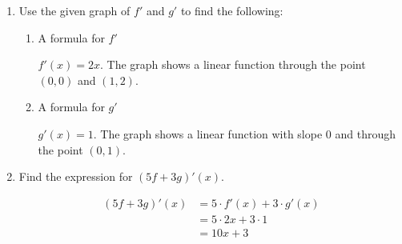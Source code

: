 \documentclass{ximera}
\begin{document}
\begin{problem}
\begin{enumerate}
	\item Use the given graph of $f'$ and $g'$ to find the following:
	\begin{enumerate}
		\item A formula for $f'$
\begin{explanation}
				$f'(x)=2x$.  The graph shows a linear function through the point $(0,0)$ and $(1,2)$.
			\end{explanation}
	
		\item A formula for $g'$
\begin{explanation}
				$g'(x)=1$.  The graph shows a linear function with slope $0$ and through the point $(0,1)$.
			\end{explanation}
	\end{enumerate}

	\item Find the expression for $(5f+3g)'(x)$.
\begin{explanation}
         \begin{align*}
           (5f+3g)'(x) &= 5\cdot f'(x) + 3 \cdot g'(x)\\
                       &= 5 \cdot 2x + 3 \cdot 1 \\
                       &= 10x+3
         \end{align*}
	\end{explanation}

  

   \end{enumerate}

\end{problem}
\end{document}
